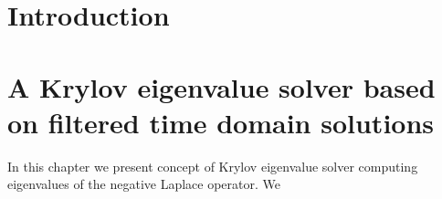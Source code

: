\documentclass[a4paper,11pt,bibliography=totoc,listof=totoc,headinclude=true,cleardoublepage=empty,oneside]{scrbook}
\begin{document}
\cleardoublepage



\tableofcontents

\cleardoublepage
{} 


\chapter{Introduction}
\label{chapter:introduction}


\chapter{A Krylov eigenvalue solver based on filtered time domain solutions}
\label{chapter:ftd}
In this chapter we present concept of Krylov eigenvalue solver computing eigenvalues of the negative Laplace operator. We 
\end{document}
